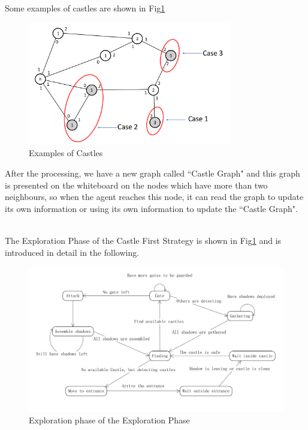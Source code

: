Some examples of castles are shown in Fig\ref{fig:CastleExample}
\begin{figure}[H]
  \centering  
  \includegraphics[width=3.5in]{figures/CastleExample.png}
  \caption{Examples of Castles}\label{fig:CastleExample}
\end{figure} 

After the processing, we have a new graph called ``Castle Graph" and this graph is presented on the whiteboard on the nodes which have more than two neighbours, so when the agent reaches this node, it can read the graph to update its own information or using its own information to update the ``Castle Graph". 

\\
The Exploration Phase of the Castle First Strategy is shown in Fig\ref{fig:CastleExample} and is introduced in detail in the following.
\begin{figure}[H]
  \centering  
  \includegraphics[width=6.0in]{figures/castlestates.png}
  \caption{Exploration phase of the Exploration Phase}\label{fig:castlestates}
\end{figure} 
 

